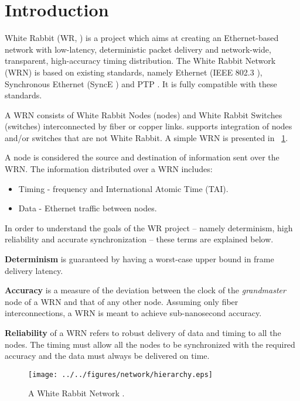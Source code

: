 \section{Introduction}

White Rabbit (WR, \cite{biblio:whiteRabbit}) is a project which aims at creating an
Ethernet-based network with low-latency, deterministic packet delivery
and network-wide, transparent, high-accuracy timing distribution. The
White Rabbit Network (WRN) is based on existing standards, namely
Ethernet (IEEE 802.3 \cite{biblio:IEEE8023}), Synchronous Ethernet
(SyncE \cite{biblio:SynchE}) and PTP \cite{biblio:IEEE1588}. 
It is fully compatible with these standards.

A WRN consists of White Rabbit Nodes (nodes) and White Rabbit Switches
(switches) interconnected by fiber or copper links. 
supports integration of nodes and/or switches that are not White Rabbit. 
A simple WRN is presented in \figurename~\ref{fig:WRnetwork}.

A node is considered the source and destination of information sent
over the WRN. The information distributed over a WRN includes:
\begin{itemize}
   \item  Timing - frequency and International Atomic Time (TAI).
   \item  Data  - Ethernet traffic between nodes.
\end{itemize} 

In order to understand the goals of the WR project -- namely
determinism, high reliability and accurate synchronization -- these
terms are explained below.

\textbf{Determinism} is guaranteed by having a worst-case upper bound
in frame delivery latency.  

\textbf{Accuracy} is a measure of the deviation between the clock of
the \textit{grandmaster} node of a WRN and that of any other node.
Assuming only fiber interconnections, a WRN is meant to achieve
sub-nanosecond accuracy. 

\textbf{Reliability} of a WRN refers to robust delivery of data and
timing to all the nodes.
The timing must allow all the nodes to be
synchronized with the required accuracy and the data must always be
delivered on time.
\begin{figure}[!t]
\centering
\texttt{[image: ../../figures/network/hierarchy.eps]}
\caption{A White Rabbit Network \cite{biblio:TomekMSc}.}
\label{fig:WRnetwork}
\end{figure}

